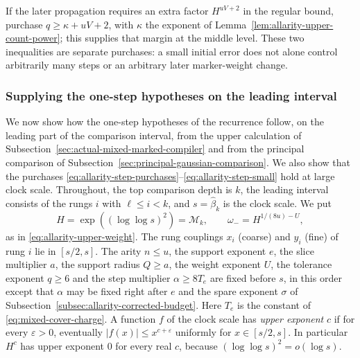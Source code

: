 If the later propagation requires an extra factor $H^{uV+2}$ in the
regular bound, purchase $q\ge\kappa+uV+2$, with $\kappa$ the exponent of
Lemma~\ref{lem:allarity-upper-count-power}; this supplies that margin at
the middle level. These two inequalities are separate purchases: a
small initial error does not alone control arbitrarily many steps or an
arbitrary later marker-weight change.

\subsubsection{Supplying the one-step hypotheses on the leading interval}
\label{subsec:allarity-step-supply}

We now show how the one-step hypotheses of the recurrence follow, on the
leading part of the comparison interval, from the upper calculation of
Subsection~\ref{sec:actual-mixed-marked-compiler} and from the principal
comparison of Subsection~\ref{sec:principal-gaussian-comparison}. We also
show that the purchases
\eqref{eq:allarity-step-purchases}--\eqref{eq:allarity-step-small} hold
at large clock scale. Throughout, the top comparison depth is $k$, the
leading interval consists of the rungs $i$ with $\ell\le i<k$, and
$s=\widehat\beta_k$ is the clock scale. We put
\[
 H=\exp((\log\log s)^2)=\mathcal M_k,\qquad
 \omega_-=H^{1/(8u)-U},
\]
as in \eqref{eq:allarity-upper-weight}. The rung couplings $x_i$ (coarse)
and $y_i$ (fine) of rung $i$ lie in $[s/2,s]$. The arity $n\le u$, the
support exponent $e$, the slice multiplier $a$, the support radius
$Q\ge a$, the weight exponent $U$, the tolerance exponent $q\ge6$ and the
step multiplier $\alpha\ge8T_e$ are fixed before $s$, in this order
except that $\alpha$ may be fixed right after $e$ and the spare exponent
$\sigma$ of Subsection~\ref{subsec:allarity-corrected-budget}. Here $T_e$ is the constant of
\eqref{eq:mixed-cover-charge}. A function $f$ of the clock scale has
\emph{upper exponent} $c$ if for every $\varepsilon>0$, eventually
$|f(x)|\le x^{c+\varepsilon}$ uniformly for $x\in[s/2,s]$. In particular
$H^{c}$ has upper exponent $0$ for every real $c$, because
$(\log\log s)^2=o(\log s)$.

